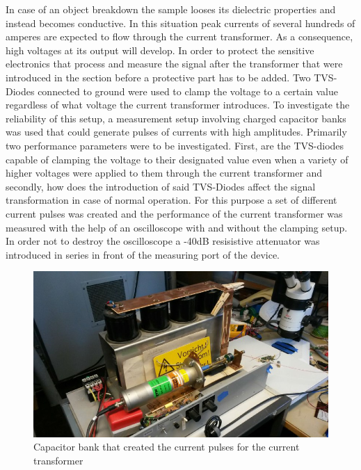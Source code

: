 In case of an object breakdown the sample looses its dielectric properties and instead becomes conductive.
In this situation peak currents of several hundreds of amperes are expected to flow through the current transformer.
As a consequence, high voltages at its output will develop. In order to protect the sensitive electronics that
process and measure the signal after the transformer that were introduced in the section before a protective part has to be added.
Two TVS-Diodes connected to ground were used to clamp the voltage to a certain value regardless of what voltage the current transformer introduces.
To investigate the reliability of this setup, a measurement setup involving charged capacitor banks was used that could generate
pulses of currents with high amplitudes. 
Primarily two performance parameters were to be investigated. First, are the TVS-diodes capable of clamping the voltage to their designated value even when
a variety of higher voltages were applied to them through the current transformer and secondly, how does the introduction of said TVS-Diodes affect the
signal transformation in case of normal operation. 
\newline
For this purpose a set of different current pulses was created and the performance of the current transformer was measured with the help of an
oscilloscope with and without the clamping setup. In order not to destroy the oscilloscope a -40dB resisistive attenuator was introduced in series in front of
the measuring port of the device.

\begin{figure}[h!tb]
\centerline{\includegraphics[scale=0.3]{figures/Method/Clamp/capacitorbank.jpg}}
    \caption{Capacitor bank that created the current pulses for the current transformer}
    \label{fig.clamp}
\end{figure}



